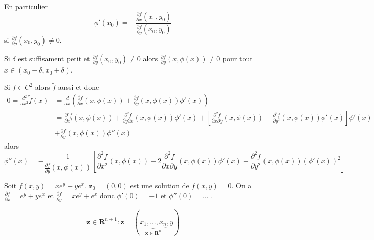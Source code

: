 En particulier 
$$
\phi'(x_{0})=-\frac{\frac{ \partial f }{ \partial x } (x_{0},y_{0})}{\frac{ \partial f }{ \partial y } (x_{0},y_{0})}
$$
si $\frac{ \partial f }{ \partial y }(x_{0},y_{0})\neq 0$.

Si $\delta$ est suffisament petit et $\frac{ \partial f }{ \partial y }(x_{0},y_{0})\neq 0$ alors $\frac{ \partial f }{ \partial y }(x,\phi(x))\neq0$ pour tout $x \in (x_{0}-\delta,x_{0}+\delta)$.

Si $f\in C^{2}$ alors $\tilde{f}$ aussi et donc
\begin{align*}
0=\frac{d^{2}}{dx^{2}}\tilde{f}(x) & =\frac{d}{dx}\left( \frac{ \partial f }{ \partial x } (x,\phi (x))+\frac{ \partial f }{ \partial y } (x,\phi(x))\phi'(x) \right) \\
 & =\frac{ \partial^{2}f }{ \partial x^{2} }(x,\phi(x))+\frac{ \partial^{2}f }{ \partial y\partial x } (x,\phi(x))\phi'(x)+\left[ \frac{ \partial^{2}f }{ \partial x\partial y } (x,\phi(x))+\frac{ \partial^{2}f }{ \partial y^{2} } (x,\phi(x))\phi'(x) \right]\phi'(x) \\
 & +\frac{ \partial f }{ \partial y } (x,\phi(x))\phi''(x) 
\end{align*}
alors
$$
\phi''(x)=-\frac{1}{\frac{ \partial f }{ \partial y } (x,\phi(x))}\left[ \frac{ \partial^{2}f }{ \partial x^{2} } (x,\phi(x))+2\frac{ \partial^{2}f }{ \partial x\partial y } (x,\phi(x))\phi'(x)+\frac{ \partial^{2}f }{ \partial y^{2} }(x,\phi(x))(\phi'(x))^{2}  \right]
$$
\begin{example}
Soit $f(x,y)=xe^{y}+ye^{ x }$. $\boldsymbol{z}_{0}=(0,0)$ est une solution de $f(x,y)=0$. On a $\frac{ \partial f }{ \partial x }=e^{ y }+ye^{ x }$ et $\frac{ \partial f }{ \partial y }=xe^{ y }+e^{ x }$ donc $\phi'(0)=-1$ et $\phi''(0)=\dots$ . 
\end{example}
\begin{notation}
$$
\boldsymbol{z}\in \mathbf{R}^{n+1}:\boldsymbol{z}=(\underbrace{ x_{1},\dots,x_{n} }_{ \boldsymbol{x}\in \mathbf{R}^{n} },y)
$$
\end{notation}
